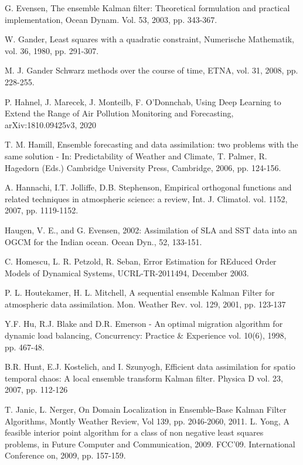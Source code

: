 \documentclass[smallcondensed]{svjour3}
\begin{document}
\begin{thebibliography}{99}
 G. Evensen, The ensemble Kalman filter: Theoretical formulation and practical implementation, Ocean Dynam. Vol.  53, 2003, pp. 343-367.


W. Gander, Least squares with a quadratic constraint, Numerische Mathematik, vol. 36, 1980, pp. 291-307.

 M. J. Gander Schwarz methods over the course of time, ETNA, vol. 31, 2008, pp. 228-255.

 P. Hahnel, J. Marecek,
J. Monteilb, F. O'Donnchab, Using Deep Learning to Extend the Range of
Air Pollution Monitoring and Forecasting, arXiv:1810.09425v3, 2020


T. M.  Hamill,  Ensemble forecasting and data assimilation: two problems with the same solution - In: Predictability of Weather and Climate, T. Palmer, R. Hagedorn
(Eds.) Cambridge University Press, Cambridge, 2006, pp. 124-156.


 A. Hannachi, I.T. Jolliffe, D.B. Stephenson, Empirical orthogonal functions and related techniques in atmospheric science: a review, Int. J. 
Climatol. vol. 1152, 2007, pp. 1119-1152.


 Haugen, V. E., and G. Evensen, 2002: Assimilation of SLA and SST data into an OGCM for the Indian ocean. Ocean Dyn., 52, 133-151.

 C. Homescu, L. R. Petzold, R. Seban,  Error Estimation for REduced Order Models of Dynamical Systems, UCRL-TR-2011494, December 2003.

 P. L.  Houtekamer,
H. L. Mitchell,  A sequential ensemble Kalman Filter for atmospheric data assimilation. Mon. Weather Rev. vol. 129, 2001, pp. 123-137


   Y.F. Hu, R.J. Blake and D.R. Emerson - An optimal migration algorithm for dynamic load balancing,
Concurrency: Practice \& Experience vol. 10(6), 1998, pp. 467-48.

 B.R. Hunt, E.J. Kostelich, and I. Szunyogh, Efficient data assimilation for spatio temporal chaos: A local ensemble transform Kalman filter. Physica D vol. 23, 2007, pp. 112-126


 T. Janic, L. Nerger, On Domain Localization in Ensemble-Base Kalman Filter Algorithms, Montly Weather Review, Vol 139, pp. 2046-2060, 2011.
L. Yong, A feasible interior point algorithm for a class of non negative least squares problems, in Future Computer and
Communication, 2009. FCC'09. International Conference on, 2009, pp. 157-159.



\end{thebibliography}
\end{document}
